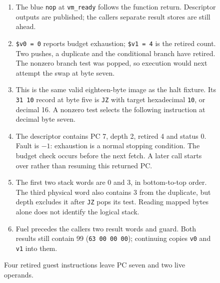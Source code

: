 \begin{figure}[htbp]
  \par\smallskip
  \begin{minipage}{\linewidth}
    \small
    \begin{enumerate}
      \setlength{\itemsep}{2pt}
            \setlength{\parsep}{0pt}
      \item The blue \texttt{nop} at \texttt{vm\_ready} follows the function return. Descriptor outputs are published; the caller\textquotesingle s separate result stores are still ahead.
      \item \texttt{\$v0 = 0} reports budget exhaustion; \texttt{\$v1 = 4} is the retired count. Two pushes, a duplicate and the conditional branch have retired. The nonzero branch test was popped, so execution would next attempt the swap at byte seven.
      \item This is the same valid eighteen-byte image as the halt fixture. Its \texttt{31 10} record at byte five is \texttt{JZ} with target hexadecimal \texttt{10}, or decimal 16. A nonzero test selects the following instruction at decimal byte seven.
      \item The descriptor contains PC 7, depth 2, retired 4 and status 0. Fault is $-1$: exhaustion is a normal stopping condition. The budget check occurs before the next fetch. A later call starts over rather than resuming this returned PC.
      \item The first two stack words are 0 and 3, in bottom-to-top order. The third physical word also contains 3 from the duplicate, but depth excludes it after \texttt{JZ} pops its test. Reading mapped bytes alone does not identify the logical stack.
      \item Fuel precedes the caller\textquotesingle s two result words and guard. Both results still contain 99 (\texttt{63 00 00 00}); continuing copies \texttt{v0} and \texttt{v1} into them.
    \end{enumerate}
  \end{minipage}
  \caption{Four retired guest instructions leave PC seven and two live operands.}
  \label{capture:018-tiny-bytecode-interpreter-f02}
  \label{vm-f02}
\end{figure}
\par
